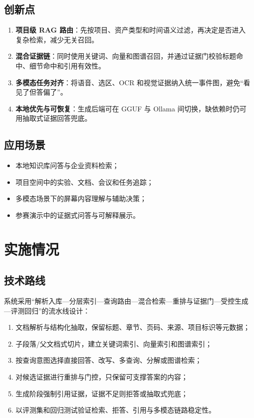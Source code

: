 \documentclass[UTF8,12pt]{ctexart}
\begin{document}
\subsection{创新点}
\begin{enumerate}
  \item \textbf{项目级 RAG 路由}：先按项目、资产类型和时间语义过滤，再决定是否进入复杂检索，减少无关召回。
  \item \textbf{混合证据链}：同时使用关键词、向量和图谱召回，并通过证据门校验标题命中、细节命中和引用有效性。
  \item \textbf{多模态任务对齐}：将语音、选区、OCR 和视觉证据纳入统一事件图，避免“看见了但答偏了”。
  \item \textbf{本地优先与可恢复}：生成后端可在 GGUF 与 Ollama 间切换，缺依赖时仍可用抽取式证据回答兜底。
\end{enumerate}

\subsection{应用场景}
\begin{itemize}
  \item 本地知识库问答与企业资料检索；
  \item 项目空间中的实验、文档、会议和任务追踪；
  \item 多模态场景下的屏幕内容理解与辅助决策；
  \item 参赛演示中的证据式问答与可解释展示。
\end{itemize}

\section{实施情况}

\subsection{技术路线}
系统采用“解析入库—分层索引—查询路由—混合检索—重排与证据门—受控生成—评测回归”的流水线设计：
\begin{enumerate}
  \item 文档解析与结构化抽取，保留标题、章节、页码、来源、项目标识等元数据；
  \item 子段落/父文档式切片，建立关键词索引、向量索引和图谱索引；
  \item 按查询意图选择直接回答、改写、多查询、分解或图谱检索；
  \item 对候选证据进行重排与门控，只保留可支撑答案的内容；
  \item 生成阶段强制引用证据，证据不足则拒答或抽取式兜底；
  \item 以评测集和回归测试验证检索、拒答、引用与多模态链路稳定性。
\end{enumerate}
\end{document}
